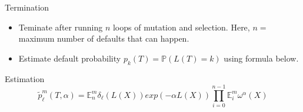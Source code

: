 \begin{frame}{Termination}
	\begin{itemize}
		\item Teminate after running $n$ loops of mutation and selection. Here, $n =$ maximum number of defaults that can happen.
		\item Estimate default probability $p_k(T) = \mathbb{P}\left( L\left( T \right) = k
		      \right)$ using formula below.
	\end{itemize}
	\begin{block}{Estimation}
		\begin{equation*}
	\tilde{p}^m_{\ell}(T,\alpha) = \mathbb{E}^{m}_{n}{\delta_{\ell}(L(X))exp(-\alpha L(X))}\prod_{i=0}^{n-1}\mathbb{E}_{i}^{m}\omega^{\alpha}(X)
				\end{equation*}
			\end{block}
		\end{frame}
